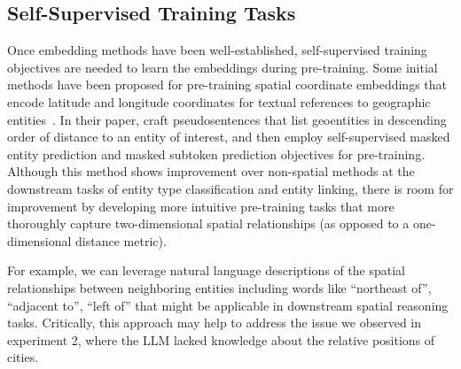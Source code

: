 


\subsection{Self-Supervised Training Tasks}
Once embedding methods have been well-established, self-supervised training objectives are needed to learn the embeddings during pre-training.
%
Some initial methods have been proposed for pre-training spatial coordinate embeddings that encode latitude and longitude coordinates for textual references to geographic entities~\cite{Li2021}.
In their paper, \citeauthor{Li2021} craft pseudosentences that list geoentities in descending order of distance to an entity of interest, and then employ self-supervised masked entity prediction and masked subtoken prediction objectives for pre-training.
Although this method shows improvement over non-spatial methods at the downstream tasks of entity type classification and entity linking, there is room for improvement by developing more intuitive pre-training tasks that more thoroughly capture two-dimensional spatial relationships (as opposed to a one-dimensional distance metric).

For example, we can leverage natural language descriptions of the spatial relationships between neighboring entities including words like ``northeast of'', ``adjacent to'', ``left of'' that might be applicable in downstream spatial reasoning tasks.
Critically, this approach may help to address the issue we observed in experiment 2, where the LLM lacked knowledge about the relative positions of cities.


